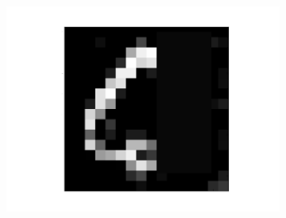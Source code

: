\begin{figure}[h!]
\begin{subfigure}{.25\textwidth}
  		\label{fig:sub1}
	\end{subfigure}%
	\begin{subfigure}{.25\textwidth}
  		\centering
  		\includegraphics[width=.6\linewidth]{imgs/poker/compl43.png}
  		\label{fig:sub1}
	\end{subfigure}%
	

\end{figure}

